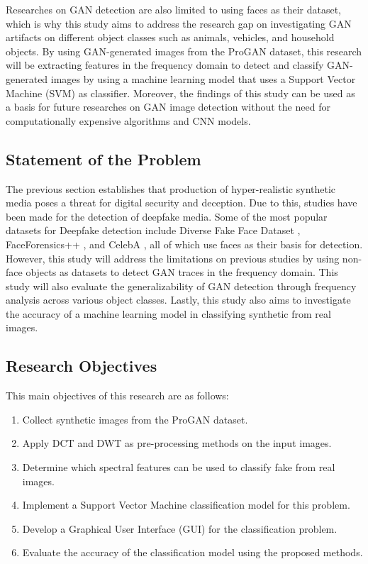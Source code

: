 \documentclass{icsthesis}
\begin{document}
\begin{mainmatter}
\par Researches on GAN detection are also limited to using faces as their dataset, which is why this study aims to address the research gap on investigating GAN artifacts on different object classes such as animals, vehicles, and household objects. By using GAN-generated images from the ProGAN dataset, this research will be extracting features in the frequency domain to detect and classify GAN-generated images by using a machine learning model that uses a Support Vector Machine (SVM) as classifier. Moreover, the findings of this study can be used as a basis for future researches on GAN image detection without the need for computationally expensive algorithms and CNN models.

\subsection{Statement of the Problem}

The previous section establishes that production of hyper-realistic synthetic media poses a threat for digital security and deception. Due to this, studies have been made for the detection of deepfake media. Some of the most popular datasets for Deepfake detection include Diverse Fake Face Dataset \citep{dffd}, FaceForensics++ \citep{faceforensics++}, and CelebA \citep{celeb-a}, all of which use faces as their basis for detection. However, this study will address the limitations on previous studies by using non-face objects as datasets to detect GAN traces in the frequency domain. This study will also evaluate the generalizability of GAN detection through frequency analysis across various object classes. Lastly, this study also aims to investigate the accuracy of a machine learning model in classifying synthetic from real images. 

\subsection{Research Objectives}
This main objectives of this research are as follows: 
\begin{enumerate}
    \item Collect synthetic images from the ProGAN dataset.
    \item Apply DCT and DWT as pre-processing methods on the input images.
    \item Determine which spectral features can be used to classify fake from real images.
    \item Implement a Support Vector Machine classification model for this problem.
    \item Develop a Graphical User Interface (GUI) for the classification problem.
    \item Evaluate the accuracy of the classification model using the proposed methods.
\end{enumerate}




\end{mainmatter}
\end{document}
